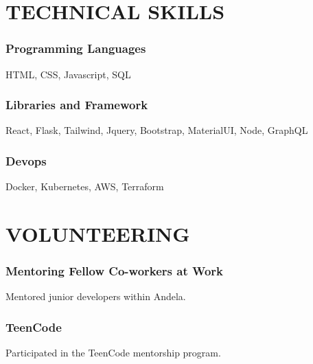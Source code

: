 \documentclass{article}
\begin{document}
\section{TECHNICAL SKILLS}
\subsubsection{Programming Languages}
HTML, CSS, Javascript, SQL
\subsubsection{Libraries and Framework}
React, Flask, Tailwind, Jquery, Bootstrap, MaterialUI, Node, GraphQL
\subsubsection{Devops}
Docker, Kubernetes, AWS, Terraform
\section{VOLUNTEERING}
\subsubsection{Mentoring Fellow Co-workers at Work}
\begin{description}[font=$\bullet$~\normalfont\scshape\color{red!50!black}]
  \item{Mentored junior developers within Andela.}
\end{description}
\subsubsection{TeenCode}
\begin{description}[font=$\bullet$~\normalfont\scshape\color{red!50!black}]
  \item{Participated in the TeenCode mentorship program.}
\end{description}
\end{document}
